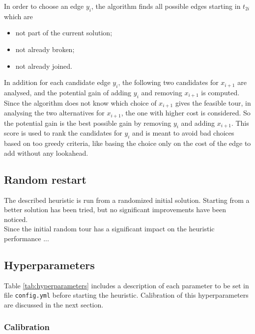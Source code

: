 In order to choose an edge $y_i$, the algorithm finds all possible edges starting in $t_{2i}$ which are 
\begin{itemize}
	\setlength\itemsep{0.05em}
	\item not part of the current solution;
	\item not already broken;
	\item not already joined.
\end{itemize}
In addition for each candidate edge $y_i$, the following two candidates for $x_{i+1}$ are analysed, and the potential gain of adding $y_i$ and removing $x_{i+1}$ is computed. Since the algorithm does not know which choice of $x_{i+1}$ gives the feasible tour, in analysing the two alternatives for $x_{i+1}$, the one with higher cost is considered. So the potential gain is the best possible gain by removing $y_i$ and adding $x_{i+1}$. This score is used to rank the candidates for $y_i$ and is meant to avoid bad choices based on too greedy criteria, like basing the choice only on the cost of the edge to add without any lookahead.

\subsection{Random restart}
The described heuristic is run from a randomized initial solution. Starting from a better solution has been tried, but no significant improvements have been noticed. \\ Since the initial random tour has a significant impact on the heuristic performance ...

\subsection{Hyperparameters}
Table \ref{tab:hyperparameters} includes a description of each parameter to be set in file \texttt{config.yml} before starting the heuristic. Calibration of this hyperparameters are discussed in the next section.





\subsubsection{Calibration}




